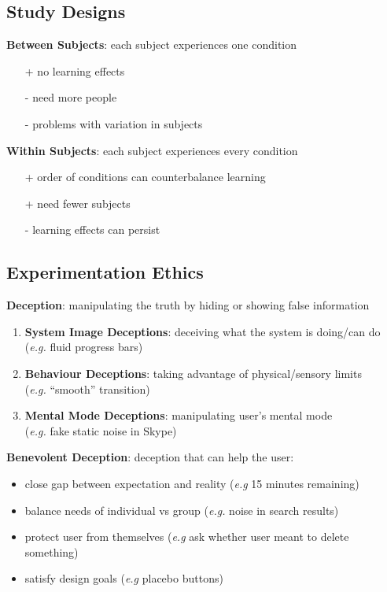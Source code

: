 \documentclass[]{article}
\theoremstyle{definition}
\begin{document}
	\subsection{Study Designs}
	\textbf{Between Subjects}: each subject experiences one condition
	\begin{itemize}
		\item[+] no learning effects
		\item[-] need more people 
		\item[-] problems with variation in subjects
	\end{itemize}
	\textbf{Within Subjects}: each subject experiences every condition
	\begin{itemize}
		\item[+] order of conditions can counterbalance learning
		\item[+] need fewer subjects
		\item[-] learning effects can persist
	\end{itemize}
		


	\subsection{Experimentation Ethics}
	\textbf{Deception}: manipulating the truth by hiding or showing false information
	\begin{enumerate}
		\item \textbf{System Image Deceptions}: deceiving what the system is doing/can do \\ (\textit{e.g.} fluid progress bars)
		\item \textbf{Behaviour Deceptions}: taking advantage of physical/sensory limits \\ (\textit{e.g.} ``smooth'' transition)
		\item \textbf{Mental Mode Deceptions}: manipulating user's mental mode \\ (\textit{e.g.} fake static noise in Skype)
	\end{enumerate}

	\textbf{Benevolent Deception}: deception that can help the user:
	\begin{itemize}
		\item close gap between expectation and reality (\textit{e.g} 15 minutes remaining)
		\item balance needs of individual vs group (\textit{e.g.} noise in search results)
		\item protect user from themselves (\textit{e.g} ask whether user meant to delete something)
		\item satisfy design goals (\textit{e.g} placebo buttons)
	\end{itemize}
\end{document}
